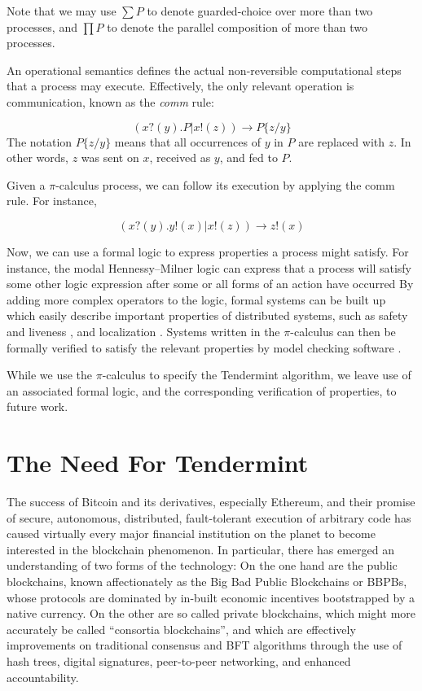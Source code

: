 Note that we may use $\sum P$ to denote guarded-choice over more than two processes,
and $\prod P$ to denote the parallel composition of more than two processes.

An operational semantics defines the actual non-reversible computational steps that a process may execute.
Effectively, the only relevant operation is communication, known as the \emph{comm} rule:

\begin{equation}
( x?(y).P | x!(z) )  \rightarrow P\{z/y\}
\end{equation} 
The notation $P\{z/y\}$ means that all occurrences of $y$ in $P$ are replaced with $z$.
In other words, $z$ was sent on $x$, received as $y$, and fed to $P$.

Given a $\pi$-calculus process, we can follow its execution by applying the comm rule.
For instance, 

\begin{equation}
( x?(y).y!(x) | x!(z) )  \rightarrow z!(x)
\end{equation} 

Now, we can use a formal logic to express properties a process might satisfy.
For instance, the modal Hennessy–Milner logic can express that a process
will satisfy some other logic expression after some or all forms of an action have occurred \cite{milner1993modal}
By adding more complex operators to the logic, 
formal systems can be built up which easily describe important properties of distributed systems,
such as safety and liveness \cite{stirling1991local}, and localization \cite{caires2003spatial}.
Systems written in the $\pi$-calculus can then be formally verified to satisfy 
the relevant properties by model checking software \cite{vieira2004spatial}.

While we use the $\pi$-calculus to specify the Tendermint algorithm, 
we leave use of an associated formal logic, 
and the corresponding verification of properties, to future work.

\section{The Need For Tendermint}

The success of Bitcoin and its derivatives, especially Ethereum, and their promise of secure, autonomous, distributed, fault-tolerant execution of arbitrary code has caused virtually every major financial institution on the planet to become interested in the blockchain phenomenon. 
In particular, there has emerged an understanding of two forms of the technology:
On the one hand are the public blockchains, known affectionately as the Big Bad Public Blockchains or BBPBs, 
whose protocols are dominated by in-built economic incentives bootstrapped by a native currency.
On the other are so called private blockchains, which might more accurately be called ``consortia blockchains'',
and which are effectively improvements on traditional consensus and BFT algorithms through the use of hash trees, digital signatures, 
peer-to-peer networking, and enhanced accountability.

